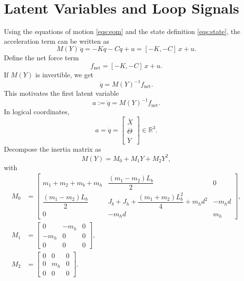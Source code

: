\documentclass[11pt]{article}
\newcommand{\R}{\mathbb{R}}
\begin{document}
\section{Latent Variables and Loop Signals}
Using the equations of motion \eqref{eqs:eom} and the state definition
\eqref{eqs:state}, the acceleration term can be written as
\begin{equation}
    M(Y)\,\ddot{q}
    =
    -Kq - C\dot{q} + u
    =
    [-K,-C]\,x + u.
    \label{eqs:mechrewrite}
\end{equation}
Define the net force term
\begin{equation}
    f_{\mathrm{net}} = [-K,-C]\,x + u.
    \label{eqs:fgen}
\end{equation}
If $M(Y)$ is invertible, we get
\begin{equation}
    \ddot{q} = M(Y)^{-1} f_{\mathrm{net}}.
    \label{eqs:qddotfromfgen}
\end{equation}
This motivates the first latent variable
\begin{equation}
    a := \ddot{q} = M(Y)^{-1} f_{\mathrm{net}}.
    \label{eqs:vdef}
\end{equation}
In logical coordinates,
\begin{equation}
    a = \ddot{q} =
    \begin{bmatrix}
        \ddot{X} \\
        \ddot{\Theta} \\
        \ddot{Y}
    \end{bmatrix} \in \R^3.
    \label{eqs:vlogic}
\end{equation}
Decompose the inertia matrix as
\begin{equation}
    M(Y) = M_0 +  M_1 Y + M_2 Y^2,
    \label{eqs:decomp}
\end{equation}
with
\begin{align}
    M_0 &=
    \begin{bmatrix}
        m_1 + m_2 + m_b + m_h &
        \dfrac{(m_1-m_2)L_b}{2} &
        0 \\
        \dfrac{(m_1-m_2)L_b}{2} &
        J_b + J_h + \dfrac{(m_1+m_2)L_b^2}{4} + m_h d^2 &
        -m_h d \\
        0 & -m_h d & m_h
    \end{bmatrix},
    \label{eqs:M0} \\
    M_1 &=
    \begin{bmatrix}
        0 & -m_h & 0 \\
        -m_h & 0 & 0 \\
        0 & 0 & 0
    \end{bmatrix},
    \label{eqs:M1} \\
    M_2 &=
    \begin{bmatrix}
        0 & 0 & 0 \\
        0 & m_h & 0 \\
        0 & 0 & 0
    \end{bmatrix}.
    \label{eqs:M2}
\end{align}
\end{document}
